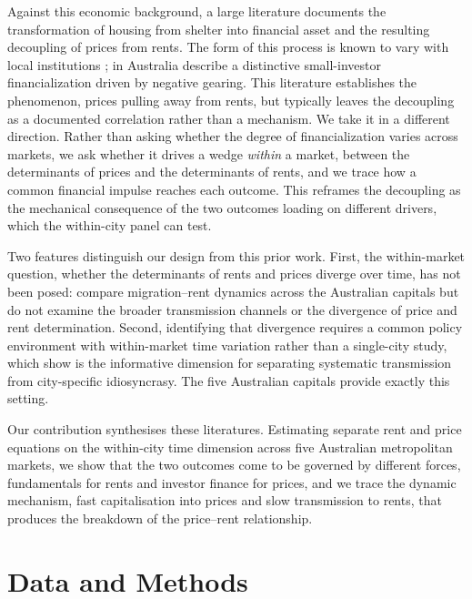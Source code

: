 \documentclass[preprint,11pt,authoryear]{elsarticle}
\begin{document}
Against this economic background, a large literature documents the
transformation of housing from shelter into financial asset
\citep{fernandez2016financialization, aalbers2021death} and the resulting
decoupling of prices from rents. The form of this process is known to
vary with local institutions \citep{christophers2015limits}; in Australia
\citet{hulse2020everyman} describe a distinctive small-investor
financialization driven by negative gearing. This literature establishes
the phenomenon, prices pulling away from rents, but typically leaves the
decoupling as a documented correlation rather than a mechanism. We take it
in a different direction. Rather than asking whether the degree of
financialization varies across markets, we ask whether it drives a wedge
\emph{within} a market, between the determinants of prices and the
determinants of rents, and we trace how a common financial impulse
reaches each outcome. This reframes the decoupling as the mechanical
consequence of the two outcomes loading on different drivers, which the
within-city panel can test.

Two features distinguish our design from this prior work. First, the
within-market question, whether the determinants of rents and prices
diverge over time, has not been posed: \citet{moallemi2020impact} compare
migration--rent dynamics across the Australian capitals but do not examine
the broader transmission channels or the divergence of price and rent
determination. Second, identifying that divergence requires a common
policy environment with within-market time variation rather than a
single-city study, which \citet{koeniger2022transmission} show is the
informative dimension for separating systematic transmission from
city-specific idiosyncrasy. The five Australian capitals provide exactly
this setting.

Our contribution synthesises these literatures. Estimating separate rent
and price equations on the within-city time dimension across five
Australian metropolitan markets, we show that the two outcomes come to be
governed by different forces, fundamentals for rents and investor finance
for prices, and we trace the dynamic mechanism, fast capitalisation into
prices and slow transmission to rents, that produces the breakdown of the
price--rent relationship.

\section{Data and Methods}
\label{sec:materials_methods}
\end{document}
